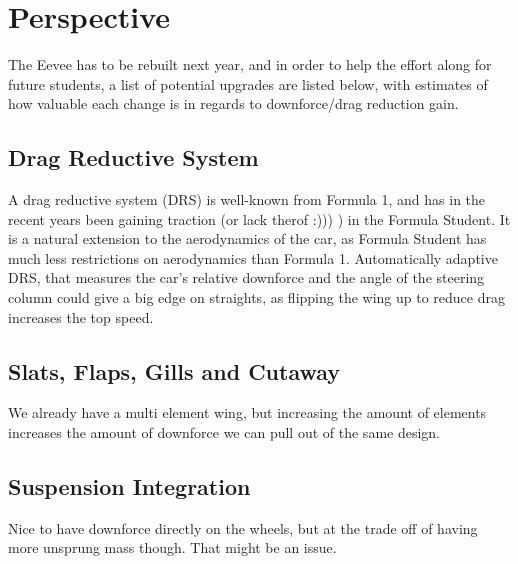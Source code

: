 \chapter*{Perspective}
\label{chap:perspective}

The Eevee has to be rebuilt next year, and in order to help the effort along for future students, a list of potential upgrades are listed below, with estimates of how valuable each change is in regards to downforce/drag reduction gain.

\section{Drag Reductive System}

A drag reductive system (DRS) is well-known from Formula 1, and has in the recent years been gaining traction (or lack therof :))) ) in the Formula Student. It is a natural extension to the aerodynamics of the car, as Formula Student has much less restrictions on aerodynamics than Formula 1. Automatically adaptive DRS, that measures the car's relative downforce and the angle of the steering column could give a big edge on straights, as flipping the wing up to reduce drag increases the top speed.

\section{Slats, Flaps, Gills and Cutaway}


We already have a multi element wing, but increasing the amount of elements increases the amount of downforce we can pull out of the same design.

\section{Suspension Integration}

Nice to have downforce directly on the wheels, but at the trade off of having more unsprung mass though. That might be an issue.
